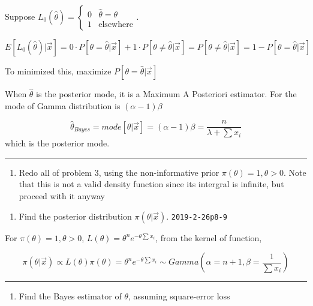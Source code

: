 \documentclass[12pt,]{article}
\providecommand{\tightlist}{%
  \setlength{\itemsep}{0pt}\setlength{\parskip}{0pt}}
\begin{document}
Suppose
\(L_0(\hat\theta)=\begin{cases}0&\hat\theta=\theta\\1&\text{elsewhere}\end{cases}\).

\[E[L_0(\hat\theta)|\vec x]=0\cdot P[\theta=\hat\theta|\vec x]+1\cdot P[\theta\neq\hat\theta|\vec x]=P[\theta\neq\hat\theta|\vec x]=1-P[\theta=\hat\theta|\vec x]\]

To minimized this, maximize \(P[\theta=\hat\theta|\vec x]\)

When \(\hat\theta\) is the posterior mode, it is a Maximum A Posteriori
estimator. For the mode of Gamma distribution is \((\alpha-1)\beta\)

\[\hat\theta_{Bayes}=mode[\theta|\vec x]=(\alpha-1)\beta=\frac{n}{\lambda+\sum x_i}\]
which is the posterior mode.

\begin{center}\rule{0.5\linewidth}{\linethickness}\end{center}

\begin{enumerate}
\def\labelenumi{\arabic{enumi}.}
\setcounter{enumi}{3}
\tightlist
\item
  \textcolor[rgb]{0.5,0.5,0.5}{Redo all of problem 3, using the non-informative prior $\pi(\theta)=1,\theta>0$. Note that this is not a valid density function since its intergral is infinite, but proceed with it anyway}
\end{enumerate}

\begin{enumerate}
\def\labelenumi{\alph{enumi}.}
\tightlist
\item
  \textcolor[rgb]{0.5,0.5,0.5}{Find the posterior distribution $\pi(\theta|\vec x)$.}
  \texttt{2019-2-26p8-9}
\end{enumerate}

For \(\pi(\theta)=1,\theta>0\),
\(L(\theta)=\theta^n e^{-\theta\sum x_i}\), from the kernel of function,

\[\pi(\theta|\vec x)\propto L(\theta)\pi(\theta)=\theta^n e^{-\theta\sum x_i}\sim Gamma(\alpha=n+1,\beta=\frac1{\sum x_i})\]

\begin{center}\rule{0.5\linewidth}{\linethickness}\end{center}

\begin{enumerate}
\def\labelenumi{\alph{enumi}.}
\setcounter{enumi}{1}
\tightlist
\item
  \textcolor[rgb]{0.5,0.5,0.5}{Find the Bayes estimator of $\theta$, assuming square-error loss}
\end{enumerate}
\end{document}
